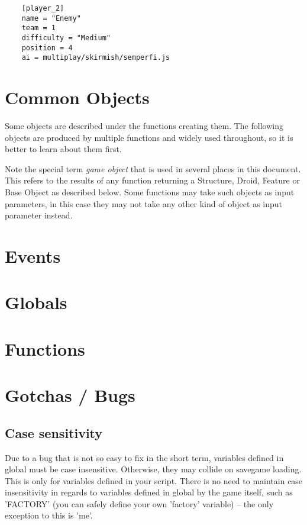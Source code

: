 \documentclass[12pt]{article}
\begin{document}
\begin{lstlisting}
	[player_2]
	name = "Enemy"
	team = 1
	difficulty = "Medium"
	position = 4
	ai = multiplay/skirmish/semperfi.js
\end{lstlisting}

\section{Common Objects}

Some objects are described under the functions creating them. The following objects are produced by
multiple functions and widely used throughout, so it is better to learn about them first.

Note the special term \emph{game object} that is used in several places in this document. This refers
to the results of any function returning a Structure, Droid, Feature or Base Object as described below.
Some functions may take such objects as input parameters, in this case they may not take any other kind
of object as input parameter instead.



\section{Events}



\section{Globals}

\begin{description}

\end{description}

\section{Functions}



\section{Gotchas / Bugs}

\subsection{Case sensitivity}
Due to a bug that is not so easy to fix in the short term, variables defined in global must be case insensitive.
Otherwise, they may collide on savegame loading. This is only for variables defined in your script. There is no
need to maintain case insensitivity in regards to variables defined in global by the game itself, such as 'FACTORY'
(you can safely define your own 'factory' variable) -- the only exception to this is 'me'.
\end{document}
